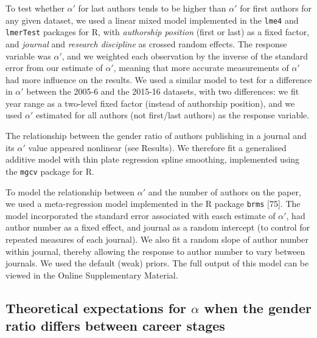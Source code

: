 \documentclass[12pt,]{article}
\begin{document}
To test whether \(\alpha'\) for last authors tends to be higher than
\(\alpha'\) for first authors for any given dataset, we used a linear
mixed model implemented in the \texttt{lme4} and \texttt{lmerTest}
packages for R, with \emph{authorship position} (first or last) as a
fixed factor, and \emph{journal} and \emph{research discipline} as
crossed random effects. The response variable was \(\alpha'\), and we
weighted each observation by the inverse of the standard error from our
estimate of \(\alpha'\), meaning that more accurate measurements of
\(\alpha'\) had more influence on the results. We used a similar model
to test for a difference in \(\alpha'\) between the 2005-6 and the
2015-16 datasets, with two differences: we fit year range as a two-level
fixed factor (instead of authorship position), and we used \(\alpha'\)
estimated for all authors (not first/last authors) as the response
variable.

The relationship between the gender ratio of authors publishing in a
journal and its \(\alpha'\) value appeared nonlinear (see Results). We
therefore fit a generalised additive model with thin plate regression
spline smoothing, implemented using the \texttt{mgcv} package for R.

To model the relationship between \(\alpha'\) and the number of authors
on the paper, we used a meta-regression model implemented in the R
package \texttt{brms} {[}75{]}. The model incorporated the standard
error associated with easch estimate of \(\alpha'\), had author number
as a fixed effect, and journal as a random intercept (to control for
repeated measures of each journal). We also fit a random slope of author
number within journal, thereby allowing the response to author number to
vary between journals. We used the default (weak) priors. The full
output of this model can be viewed in the Online Supplementary Material.

\subsection{\texorpdfstring{Theoretical expectations for \(\alpha\) when
the gender ratio differs between career
stages}{Theoretical expectations for \textbackslash{}alpha when the gender ratio differs between career stages}}\label{theoretical-expectations-for-alpha-when-the-gender-ratio-differs-between-career-stages-1}
\end{document}
